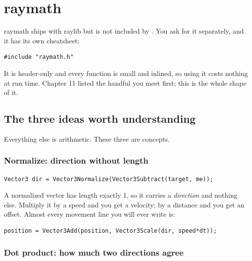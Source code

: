 \chapter{raymath}

raymath ships with raylib but is not included by . You ask for it
separately, and it has its own cheatsheet:

\begin{lstlisting}
#include "raymath.h"
\end{lstlisting}

It is header-only and every function is small and inlined, so using it costs
nothing at run time. Chapter 11 listed the handful you meet first; this is the
whole shape of it.

\section{The three ideas worth understanding}

Everything else is arithmetic. These three are concepts.

\subsection{Normalize: direction without length}

\begin{lstlisting}
Vector3 dir = Vector3Normalize(Vector3Subtract(target, me));
\end{lstlisting}

A normalized vector has length exactly 1, so it carries a \emph{direction} and
nothing else. Multiply it by a speed and you get a velocity; by a distance and
you get an offset. Almost every movement line you will ever write is:

\begin{lstlisting}
position = Vector3Add(position, Vector3Scale(dir, speed*dt));
\end{lstlisting}


\subsection{Dot product: how much two directions agree}

